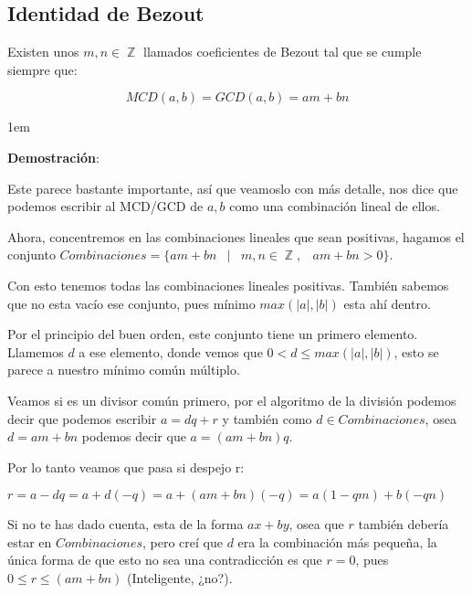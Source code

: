 \documentclass[12pt, fleqn]{report}                             %
\newcommand \Quote {\qq}                                        %
\newenvironment{SmallIndentation}[1][0.75em]                    %
    {\begin{adjustwidth}{#1}{}\begin{footnotesize}}                 %
    {\end{footnotesize}\end{adjustwidth}}                           %
\DeclareMathOperator \Space {\quad}                             %
\DeclareMathOperator \MiniSpace {\;}                            %
\newcommand \Such {\MiniSpace|\MiniSpace}                       %
\DeclareMathOperator \Integers  {\mathbb{Z}}                     %
\begin{document}
        \clearpage
        \subsection{Identidad de Bezout}

            Existen unos $m, n \in \Integers$ llamados coeficientes de Bezout tal que se
            cumple siempre que:

            \begin{equation}
                MCD(a,b) = GCD(a,b) = am+bn
            \end{equation}

            \begin{SmallIndentation}[1em]
                \textbf{Demostración}:

                Este \Quote{teorema} parece bastante importante, así que veamoslo con más detalle,
                nos dice que podemos escribir al MCD/GCD de $a,b$ como una combinación lineal de
                ellos.

                Ahora, concentremos en las combinaciones lineales que sean positivas, hagamos el conjunto
                $Combinaciones = \{ am+bn \Such m, n \in \Integers, \MiniSpace am+bn > 0 \}$.

                Con esto tenemos todas las combinaciones lineales positivas.
                También sabemos que no esta vacío ese conjunto, pues mínimo $max(|a|,|b|)$ esta ahí dentro.

                Por el principio del buen orden, este conjunto tiene un primero elemento.
                Llamemos $d$ a ese elemento, donde vemos que $0 < d \leq max(|a|,|b|)$,
                esto se parece a nuestro mínimo común múltiplo.

                Veamos si es un divisor común primero, por el algoritmo de la división podemos decir
                que podemos escribir $a = dq + r$ y también como $d \in Combinaciones$, osea
                $d = am+bn$ podemos decir que $a = (am+bn)q$.

                Por lo tanto veamos que pasa si despejo r:

                $r = a-dq = a + d(-q) = a + (am+bn)(-q) = a(1-qm) + b(-qn)$

                Si no te has dado cuenta, esta de la forma $ax+by$, osea que $r$ también debería estar
                en $Combinaciones$, pero creí que $d$ era la combinación más pequeña, la única forma
                de que esto no sea una contradicción es que $r=0$, pues $0 \leq r \leq (am+bn)$
                (Inteligente, ¿no?).
                

\end{SmallIndentation}
\end{document}
